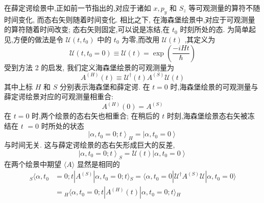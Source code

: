 \documentclass[lang=cn,newtx,10pt,scheme=chinese,thmcnt=section]{elegantbook}
\begin{document}
在薛定谔绘景中,正如前一节指出的,对应于诸如 $x,{p}_{y}$ 和 ${S}_{z}$ 等可观测量的算符不随时间变化, 而态右矢则随着时间变化. 相比之下, 在海森堡绘景中,对应于可观测量的算符随着时间改变; 态右矢则固定,可以说是冻结,在 ${t}_{0}$ 时刻所处的态. 为简单起见,方便的做法是令 $\mathcal{U}\left( {t,{t}_{0}}\right)$ 中的 ${t}_{0}$ 为零,而改用 $\mathcal{U}\left( t\right)$ ,其定义为
\begin{equation}
	\mathcal{U}\left( {t,{t}_{0} = 0}\right) \equiv \mathcal{U}\left( t\right) = \exp \left( \frac{-{iHt}}{\hbar }\right)
\end{equation}
受到方法 2 的启发, 我们定义海森堡绘景的可观测量为
\begin{equation}\label{2.84}
	{A}^{\left( H\right) }\left( t\right) \equiv {\mathcal{U}}^{ \dagger }\left( t\right) {A}^{\left( S\right) }\mathcal{U}\left( t\right)
\end{equation}
其中上标 $H$ 和 $S$ 分别表示海森堡和薛定谔. 在 $t = 0$ 时,海森堡绘景的可观测量与薛定谔绘景对应的可观测量相重合:
\begin{equation}
	{A}^{\left( H\right) }\left( 0\right) = {A}^{\left( S\right) }
\end{equation}
在 $t = 0$ 时,两个绘景的态右矢也相重合; 在稍后的 $t$ 时刻,海森堡绘景态右矢被冻结在 $t$ $= 0$ 时所处的状态
\begin{equation}
	{\left| \alpha ,{t}_{0} = 0;t\right\rangle }_{H} = \left| {\alpha ,{t}_{0} = 0}\right\rangle
\end{equation}
与时间无关. 这与薛定谔绘景的态右矢形成巨大的反差,
\begin{equation}
	\left| {\alpha ,{t}_{0} = 0;t}\right\rangle_S = \mathcal{U}\left( t\right) \left| {\alpha ,{t}_{0} = 0}\right\rangle 
\end{equation}
在两个绘景中期望 $\langle A\rangle$ 显然是相同的
\begin{equation}
	\begin{aligned}
		{}_S\langle \alpha ,{t}_{0} &= 0;t| {A}^{\left( S\right) }| \alpha ,{t}_{0} = 0;t\rangle {}_S = \langle {\alpha ,{t}_{0} = 0 | {\mathcal{U}}^{ \dagger }{A}^{\left( S\right) }\mathcal{U} | \alpha,{t}_{0} = 0}\rangle\\
		&= {}_{H}\langle {\alpha ,{t}_{0} = 0;t| {{A}^{\left( H\right) }\left( t\right) }| \alpha ,{t}_{0} = 0;t}\rangle {}_{H}
	\end{aligned}
\end{equation}
\end{document}
